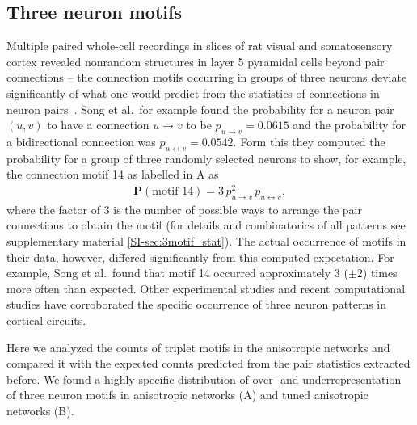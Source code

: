 \clearpage
\pagebreak
\newpage
\subsection*{Three neuron motifs}

Multiple paired whole-cell recordings in slices of rat visual and
somatosensory cortex revealed nonrandom structures in layer 5
pyramidal cells beyond pair connections -- the connection motifs
occurring in groups of three neurons deviate significantly of what one
would predict from the statistics of connections in neuron
pairs~\cite{Song2005, Perin2011}. Song et al.~for example found the
probability for a neuron pair $(u,v)$ to have a connection
$u \rightarrow v$ to be $p_{u \rightarrow v}= 0.0615$ and the
probability for a bidirectional connection was
$p_{u \leftrightarrow v} = 0.0542$. Form this they computed the
probability for a group of three randomly selected neurons to show,
for example, the connection motif 14 as labelled in
A as
\begin{align*}
  \textbf{P}(\text{motif 14})= 3 \,p_{u \rightarrow v}^2
                                 \, p_{u \leftrightarrow v}, \label{eq:m14}
\end{align*}
where the factor of 3 is the number of possible ways to arrange the
pair connections to obtain the motif (for details and combinatorics of
all patterns see supplementary material \ref{SI-sec:3motif_stat}). The
actual occurrence of motifs in their data, however, differed
significantly from this computed expectation. For example, Song et
al.~found that motif 14 occurred approximately 3 ($\pm 2$) times more
often than expected. Other experimental studies \cite{Perin2011,
  Rieubland2014} and recent computational studies
\cite{Miner2016,Gal2017} have corroborated the specific occurrence of
three neuron patterns in cortical circuits.

Here we analyzed the counts of triplet motifs in the anisotropic
networks and compared it with the expected counts predicted from the
pair statistics extracted before. We found a highly specific
distribution of over- and underrepresentation of three neuron motifs
in anisotropic networks (A) and tuned anisotropic
networks (B).%
%

%

